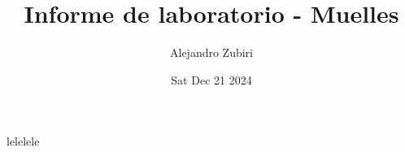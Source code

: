 \documentclass{article}
\author{Alejandro Zubiri}
\date{Sat Dec 21 2024}
\title{Informe de laboratorio - Muelles}
\begin{document}
\maketitle
lelelele
\end{document}
